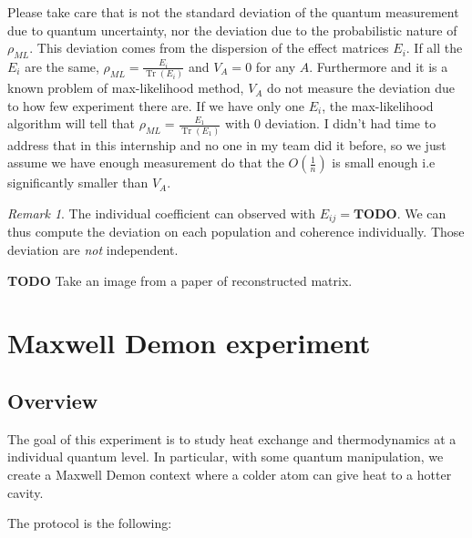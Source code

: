 \documentclass[10pt]{report}
\theoremstyle{plain}
\theoremstyle{definition}
\theoremstyle{remark}
\newtheorem*{rem}{Remark}
\newcommand{\TODO}{\textbf{TODO}}
\DeclareMathOperator{\Tr}{Tr}
\newcommand{\trnorm}[1]{\frac{#1}{\Tr\left({#1}\right)}}
\newcommand{\ml}{_{M\!L}}
\begin{document}
Please take care that is not the standard deviation of the quantum measurement
due to quantum uncertainty, nor the deviation due to the probabilistic nature of
$\rho\ml$. This deviation comes from the dispersion of the effect matrices
$E_i$. If all the $E_i$ are the same, $\rho\ml = \trnorm{E_i}$ and $V_A = 0$ for
any $A$. Furthermore and it is a known problem of max-likelihood method, $V_A$
do not measure the deviation due to how few experiment there are. If we have
only one $E_i$, the max-likelihood algorithm will tell that $\rho\ml =
\trnorm{E_1}$ with 0 deviation. I didn't had time to address that in this
internship and no one in my team did it before, so we just assume we have
enough measurement do that the $O(\frac1n)$ is small enough i.e significantly
smaller than $V_A$.

\begin{rem} The individual coefficient can observed with $E_{ij} = \TODO$. We
  can thus compute the deviation on each population and coherence individually.
  Those deviation are \emph{not} independent.
\end{rem}

\TODO{} Take an image from a paper of reconstructed matrix.

\section{Maxwell Demon experiment}

\subsection{Overview}

The goal of this experiment is to study heat exchange and thermodynamics at a
individual quantum level. In particular, with some quantum manipulation, we
create a Maxwell Demon context where a colder atom can give heat to a hotter
cavity.

The protocol is the following:
\end{document}
